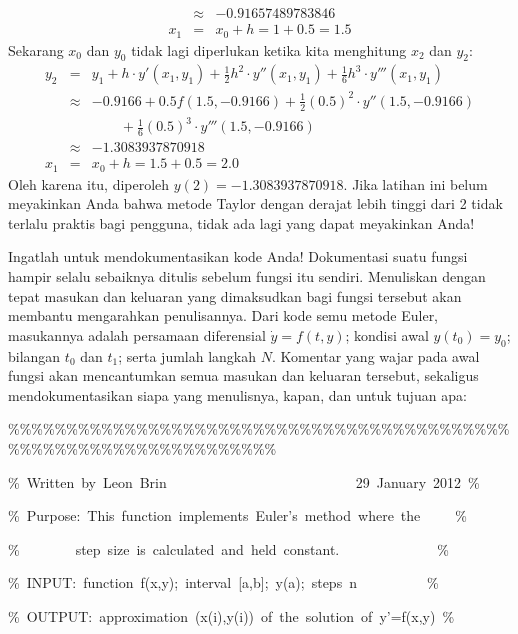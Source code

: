 \begin{description}
\begin{eqnarray*}
 & \approx & -0.91657489783846\\
x_{1} & = & x_{0}+h=1+0.5=1.5
\end{eqnarray*}
Sekarang $x_{0}$ dan $y_{0}$ tidak lagi diperlukan ketika kita menghitung
$x_{2}$ dan $y_{2}$:
\begin{eqnarray*}
y_{2} & = & y_{1}+h\cdot y'(x_{1},y_{1})+\frac{1}{2}h^{2}\cdot y''(x_{1},y_{1})+\frac{1}{6}h^{3}\cdot y'''(x_{1},y_{1})\\
 & \approx & -0.9166+0.5f(1.5,-0.9166)+\frac{1}{2}(0.5)^{2}\cdot y''(1.5,-0.9166)\\
 &  & \qquad+\frac{1}{6}(0.5)^{3}\cdot y'''(1.5,-0.9166)\\
 & \approx & -1.3083937870918\\
x_{1} & = & x_{0}+h=1.5+0.5=2.0
\end{eqnarray*}
Oleh karena itu, diperoleh $y(2)=-1.3083937870918$. Jika latihan
ini belum meyakinkan Anda bahwa metode Taylor dengan derajat lebih
tinggi dari 2 tidak terlalu praktis bagi pengguna, tidak ada lagi
yang dapat meyakinkan Anda!
\item [{\ref{exc:ode-taylor-2}:}] Ingatlah untuk mendokumentasikan kode
Anda! Dokumentasi suatu fungsi hampir selalu sebaiknya ditulis sebelum
fungsi itu sendiri. Menuliskan dengan tepat masukan dan keluaran yang
dimaksudkan bagi fungsi tersebut akan membantu mengarahkan penulisannya.
Dari kode semu metode Euler, masukannya adalah persamaan diferensial
$\dot{y}=f(t,y)$; kondisi awal $y(t_{0})=y_{0}$; bilangan $t_{0}$
dan $t_{1}$; serta jumlah langkah $N$. Komentar yang wajar pada
awal fungsi akan mencantumkan semua masukan dan keluaran tersebut,
sekaligus mendokumentasikan siapa yang menulisnya, kapan, dan untuk
tujuan apa:

\begin{lyxcode}
\%\%\%\%\%\%\%\%\%\%\%\%\%\%\%\%\%\%\%\%\%\%\%\%\%\%\%\%\%\%\%\%\%\%\%\%\%\%\%\%\%\%\%\%\%\%\%\%\%\%\%\%\%\%\%\%\%\%\%\%\%\%\%\%\%\%

\%~Written~by~Leon~Brin~~~~~~~~~~~~~~~~~~~~~~~~~~~29~January~2012~\%

\%~Purpose:~This~function~implements~Euler's~method~where~the~~~~~\%

\%~~~~~~~~step~size~is~calculated~and~held~constant.~~~~~~~~~~~~~~\%

\%~INPUT:~function~f(x,y);~interval~{[}a,b{]};~y(a);~steps~n~~~~~~~~~~\%

\%~OUTPUT:~approximation~(x(i),y(i))~of~the~solution~of~y'=f(x,y)~\%


\end{lyxcode}
\end{description}

